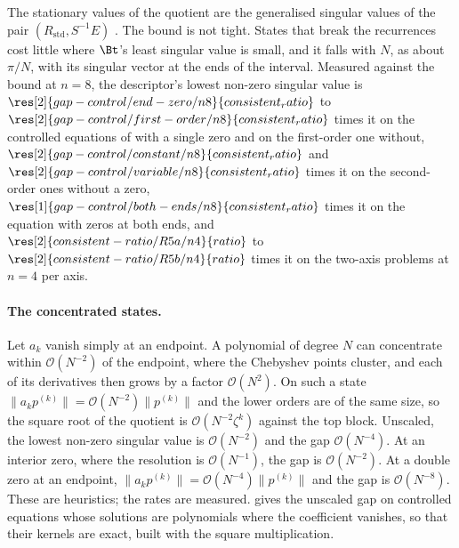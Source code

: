 The stationary values of the quotient are the generalised singular values of the pair $(R_{\mathrm{std}},S^{-1}E)$ \cite{vanloan1976gsvd}. The bound is not tight. States that break the recurrences cost little where $\Bt$'s least singular value is small, and it falls with $N$, as about $\pi/N$, with its singular vector at the ends of the interval. Measured against the bound at $n=8$, the descriptor's lowest non-zero singular value is $\res[2]{gap-control/end-zero/n8}{consistent_ratio}$ to $\res[2]{gap-control/first-order/n8}{consistent_ratio}$ times it on the controlled equations of  with a single zero and on the first-order one without, $\res[2]{gap-control/constant/n8}{consistent_ratio}$ and $\res[2]{gap-control/variable/n8}{consistent_ratio}$ times it on the second-order ones without a zero, $\res[1]{gap-control/both-ends/n8}{consistent_ratio}$ times it on the equation with zeros at both ends, and $\res[2]{consistent-ratio/R5a/n4}{ratio}$ to $\res[2]{consistent-ratio/R5b/n4}{ratio}$ times it on the two-axis problems at $n=4$ per axis.

\paragraph{The concentrated states.} Let $a_k$ vanish simply at an endpoint. A polynomial of degree $N$ can concentrate within $\mathcal{O}(N^{-2})$ of the endpoint, where the Chebyshev points cluster, and each of its derivatives then grows by a factor $\mathcal{O}(N^2)$. On such a state $\|a_kp^{(k)}\|=\mathcal{O}(N^{-2})\|p^{(k)}\|$ and the lower orders are of the same size, so the square root of the quotient is $\mathcal{O}(N^{-2}\zeta^k)$ against the top block. Unscaled, the lowest non-zero singular value is $\mathcal{O}(N^{-2})$ and the gap $\mathcal{O}(N^{-4})$. At an interior zero, where the resolution is $\mathcal{O}(N^{-1})$, the gap is $\mathcal{O}(N^{-2})$. At a double zero at an endpoint, $\|a_kp^{(k)}\|=\mathcal{O}(N^{-4})\|p^{(k)}\|$ and the gap is $\mathcal{O}(N^{-8})$. These are heuristics; the rates are measured.  gives the unscaled gap on controlled equations whose solutions are polynomials where the coefficient vanishes, so that their kernels are exact, built with the square multiplication.

